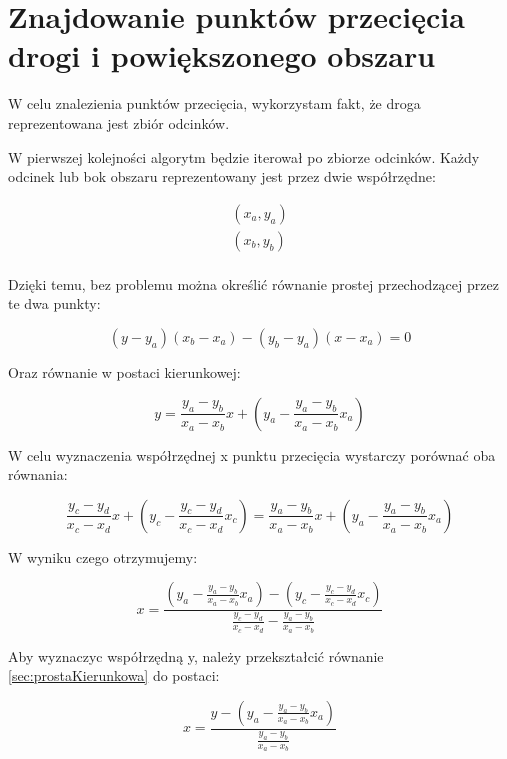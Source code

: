 \newpage
\section{Znajdowanie punktów przecięcia drogi i powiększonego obszaru}
\label{sec:ZnajdowaniePunktówPrzecięciaDrogiIPowiększonegoObszaru}
W celu znalezienia punktów przecięcia, wykorzystam fakt, że droga reprezentowana jest zbiór odcinków.

W pierwszej kolejności algorytm będzie iterował po zbiorze odcinków. Każdy odcinek lub bok obszaru reprezentowany jest przez dwie współrzędne:

\begin{equation}
\begin{split}
(x_a, y_a) \\
(x_b, y_b) \\
\end{split}
\end{equation}

Dzięki temu, bez problemu można określić równanie prostej przechodzącej przez te dwa punkty:

\begin{equation}
(y - y_a) (x_b-x_a) - (y_b - y_a) (x - x_a) = 0
\end{equation}

Oraz równanie w postaci kierunkowej:

\begin{equation} \label{sec:prostaKierunkowa}
y=\frac{y_a - y_b}{x_a - x_b}x + (y_a - \frac{y_a - y_b}{x_a - x_b}x_a)
\end{equation}

W celu wyznaczenia współrzędnej x punktu przecięcia wystarczy porównać oba równania:

\begin{equation}
\frac{y_c - y_d}{x_c - x_d}x + (y_c - \frac{y_c - y_d}{x_c - x_d}x_c)=\frac{y_a - y_b}{x_a - x_b}x + (y_a - \frac{y_a - y_b}{x_a - x_b}x_a)
\end{equation}

W wyniku czego otrzymujemy:

\begin{equation}
x = \frac{(y_a - \frac{y_a - y_b}{x_a - x_b}x_a) - (y_c - \frac{y_c - y_d}{x_c - x_d}x_c)}{\frac{y_c - y_d}{x_c - x_d} - \frac{y_a - y_b}{x_a - x_b}}
\end{equation}

Aby wyznaczyc współrzędną y, należy przekształcić równanie \ref{sec:prostaKierunkowa} do postaci:

\begin{equation}
x=\frac{y - (y_a - \frac{y_a - y_b}{x_a - x_b}x_a)}{\frac{y_a - y_b}{x_a - x_b}}
\end{equation}

